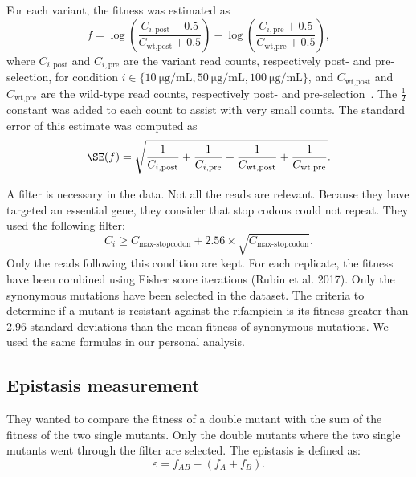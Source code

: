 \documentclass[12pt]{article}
\begin{document}
  For each variant, the fitness was estimated as 
  \begin{equation}\label{eq:fitnessscore}
    f = \log\left(\frac{C_{i, \text{post}} + 0.5}{C_{\text{wt}, \text{post}} +
    0.5}\right) - 
    \log\left(\frac{C_{i, \text{pre}} + 0.5}{C_{\text{wt}, \text{pre}} +
    0.5}\right),
  \end{equation}
  where $C_{i, \text{post}}$ and $C_{i, \text{pre}}$ are the variant read
  counts, respectively post- and pre-selection, for condition
  $i\in\{\SI{10}{\micro\gram\per\milli\liter},
  \SI{50}{\micro\gram\per\milli\liter},
  \SI{100}{\micro\gram\per\milli\liter}\}$, and $C_{\text{wt}, \text{post}}$
  and $C_{\text{wt}, \text{pre}}$ are the wild-type read counts, respectively
  post- and pre-selection~\cite{rubin2017}. The $\frac{1}{2}$ constant was
  added to each count to assist with very small counts. The standard error of
  this estimate was computed as
  \begin{equation}\label{eq:fitnesserror}
    \SE(f) = \sqrt{\frac{1}{C_{i, \text{post}}} + \frac{1}{C_{i, \text{pre}}} +
    \frac{1}{C_{\text{wt}, \text{post}}} + \frac{1}{C_{\text{wt},
    \text{pre}}}}.
  \end{equation}

  A filter is necessary in the data. Not all the reads are relevant. Because
  they have targeted an essential gene, they consider that stop codons could
  not repeat. They used the following filter:
  \begin{equation}\label{eq:stopfilter}
    C_{i} \geq C_{\text{max-stopcodon}} + 2.56 \times
    \sqrt{C_{\text{max-stopcodon}}}.
  \end{equation}
  Only the reads following this condition are kept. For each replicate, the
  fitness have been combined using Fisher score iterations (Rubin et al. 2017).
  Only the synonymous mutations have been selected in the dataset. The criteria
  to determine if a mutant is resistant against the rifampicin is its fitness
  greater than 2.96 standard deviations than the mean fitness of synonymous
  mutations.
  \newline
  \newline
  We used the same formulas in our personal analysis.

  \subsection{Epistasis measurement}

  They wanted to compare the fitness of a double mutant with the sum of the
  fitness of the two single mutants. Only the double mutants where the two
  single mutants went through the filter are selected. The epistasis is defined
  as:
  \begin{equation}\label{eq:epistasis}
    \varepsilon = f_{AB} - (f_A + f_B).
  \end{equation}
\end{document}
